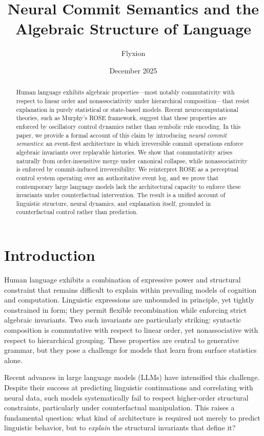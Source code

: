 \documentclass[11pt]{article}
\title{Neural Commit Semantics and the Algebraic Structure of Language}
\author{Flyxion}
\date{December 2025}
\begin{document}
\maketitle

\begin{abstract}
Human language exhibits algebraic properties—most notably commutativity with respect to linear order and nonassociativity under hierarchical composition—that resist explanation in purely statistical or state-based models. Recent neurocomputational theories, such as Murphy’s ROSE framework, suggest that these properties are enforced by oscillatory control dynamics rather than symbolic rule encoding. In this paper, we provide a formal account of this claim by introducing \emph{neural commit semantics}: an event-first architecture in which irreversible commit operations enforce algebraic invariants over replayable histories. We show that commutativity arises naturally from order-insensitive merge under canonical collapse, while nonassociativity is enforced by commit-induced irreversibility. We reinterpret ROSE as a perceptual control system operating over an authoritative event log, and we prove that contemporary large language models lack the architectural capacity to enforce these invariants under counterfactual intervention. The result is a unified account of linguistic structure, neural dynamics, and explanation itself, grounded in counterfactual control rather than prediction.
\end{abstract}

\section{Introduction}

Human language exhibits a combination of expressive power and structural constraint that remains difficult to explain within prevailing models of cognition and computation. Linguistic expressions are unbounded in principle, yet tightly constrained in form; they permit flexible recombination while enforcing strict algebraic invariants. Two such invariants are particularly striking: syntactic composition is commutative with respect to linear order, yet nonassociative with respect to hierarchical grouping. These properties are central to generative grammar, but they pose a challenge for models that learn from surface statistics alone.

Recent advances in large language models (LLMs) have intensified this challenge. Despite their success at predicting linguistic continuations and correlating with neural data, such models systematically fail to respect higher-order structural constraints, particularly under counterfactual manipulation. This raises a fundamental question: what kind of architecture is required not merely to predict linguistic behavior, but to \emph{explain} the structural invariants that define it?
\end{document}
